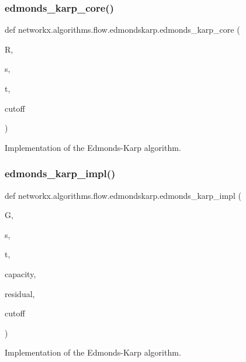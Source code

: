\subsubsection{\texorpdfstring{edmonds\+\_\+karp\+\_\+core()}{edmonds\_karp\_core()}}
{\footnotesize\ttfamily def networkx.\+algorithms.\+flow.\+edmondskarp.\+edmonds\+\_\+karp\+\_\+core (\begin{DoxyParamCaption}\item[{}]{R,  }\item[{}]{s,  }\item[{}]{t,  }\item[{}]{cutoff }\end{DoxyParamCaption})}

\begin{DoxyVerb}Implementation of the Edmonds-Karp algorithm.\end{DoxyVerb}
 \mbox{\label{namespacenetworkx_1_1algorithms_1_1flow_1_1edmondskarp_ae76282a2098693f7b0b9eb1c94385fb3}} 
\subsubsection{\texorpdfstring{edmonds\+\_\+karp\+\_\+impl()}{edmonds\_karp\_impl()}}
{\footnotesize\ttfamily def networkx.\+algorithms.\+flow.\+edmondskarp.\+edmonds\+\_\+karp\+\_\+impl (\begin{DoxyParamCaption}\item[{}]{G,  }\item[{}]{s,  }\item[{}]{t,  }\item[{}]{capacity,  }\item[{}]{residual,  }\item[{}]{cutoff }\end{DoxyParamCaption})}

\begin{DoxyVerb}Implementation of the Edmonds-Karp algorithm.\end{DoxyVerb}
 